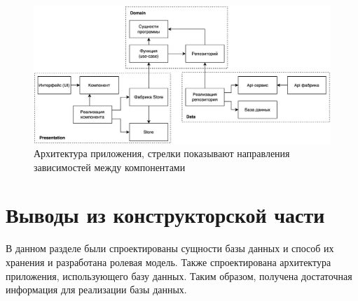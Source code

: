 \begin{figure}[H]
	\centering
	\includegraphics[height=0.3\textheight, width=\textwidth]{tools/img/component.png}
	\caption{
        Архитектура приложения, стрелки показывают направления зависимостей между компонентами
    }
	\label{fig:component}
\end{figure}

\section*{Выводы из конструкторской части}
В данном разделе были спроектированы сущности базы данных и способ их хранения и разработана ролевая модель.
Также спроектирована архитектура приложения, использующего базу данных.
Таким образом, получена достаточная информация для реализации базы данных.